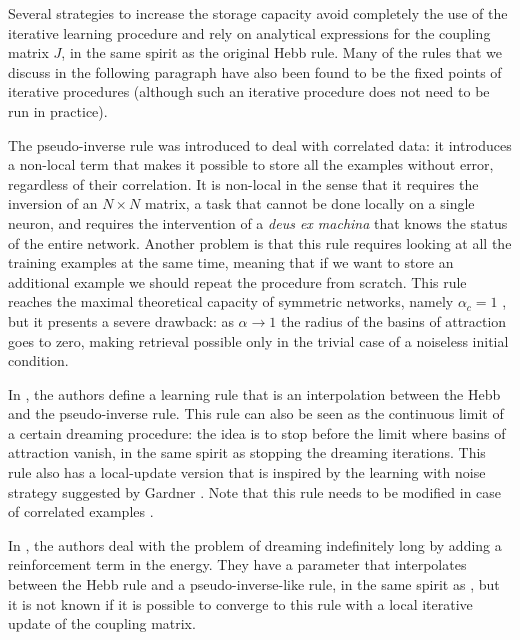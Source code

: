 \documentclass[a4paper]{cas-sc}
\begin{document}
Several strategies to increase the storage capacity avoid completely the use of the iterative learning procedure and rely on analytical expressions for the coupling matrix $J$, in the same spirit as the original Hebb rule. 
Many of the rules that we discuss in the following paragraph have also been found to be the fixed points of iterative procedures (although such an iterative procedure does not need to be run in practice).

The pseudo-inverse rule \cite{personnaz1985information, kanter1987associative} was introduced to deal with correlated data: it introduces a non-local term that makes it possible to store all the examples without error, regardless of their correlation. It is non-local in the sense that it requires the inversion of an $N \times N$ matrix, a task that cannot be done locally on a single neuron, and requires the intervention of a \textit{deus ex machina} that knows the status of the entire network. Another problem is that this rule requires looking at all the training examples at the same time, meaning that if we want to store an additional example we should repeat the procedure from scratch. This rule reaches the maximal theoretical capacity of symmetric networks, namely $\alpha_c=1$ \cite{gardner1988space}, but it presents a severe drawback: as $\alpha\to1$  the radius of the basins of attraction goes to zero, making retrieval possible only in the trivial case of a noiseless initial condition.

In \cite{dotsenko1991replica, dotsenko1991statistical}, the authors define a learning rule that is an interpolation between the Hebb and the pseudo-inverse rule. This rule can also be seen as the continuous limit of a certain dreaming procedure: the idea is to stop before the limit where basins of attraction vanish, in the same spirit as stopping the dreaming iterations. This rule also has a local-update version that is inspired by the learning with noise strategy suggested by Gardner \cite{gardner1989training}. Note that this rule needs to be modified in case of correlated examples \cite{der1992modified}.

In \cite{fachechi2019dreaming}, the authors deal with the problem of dreaming indefinitely long by adding a reinforcement term in the energy. They have a parameter that interpolates between the Hebb rule and a pseudo-inverse-like rule, in the same spirit as \cite{dotsenko1991statistical, dotsenko1991replica}, but it is not known if it is possible to converge to this rule with a local iterative update of the coupling matrix.
\end{document}
